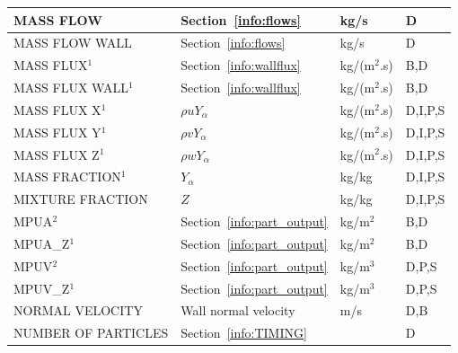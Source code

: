\documentclass[11pt]{book}
\begin{document}
\begin{longtable}{@{\extracolsep{\fill}}|l|l|l|l|}
{\ct MASS FLOW}                                 & Section~\ref{info:flows}                      & kg/s           & D            \\ \hline
{\ct MASS FLOW WALL}                            & Section~\ref{info:flows}                      & kg/s           & D            \\ \hline
{\ct MASS FLUX}$^1$                             & Section~\ref{info:wallflux}                   & \si{kg/(m$^2$.s)} & B,D       \\ \hline
{\ct MASS FLUX WALL}$^1$                        & Section~\ref{info:wallflux}                   & \si{kg/(m$^2$.s)} & B,D       \\ \hline
{\ct MASS FLUX X}$^1$                           & $\rho u Y_\alpha$                             & \si{kg/(m$^2$.s)} & D,I,P,S   \\ \hline
{\ct MASS FLUX Y}$^1$                           & $\rho v Y_\alpha$                             & \si{kg/(m$^2$.s)} & D,I,P,S   \\ \hline
{\ct MASS FLUX Z}$^1$                           & $\rho w Y_\alpha$                             & \si{kg/(m$^2$.s)} & D,I,P,S   \\ \hline
{\ct MASS FRACTION}$^1$                         & $Y_\alpha$                                    & kg/kg          & D,I,P,S      \\ \hline
{\ct MIXTURE FRACTION}                          & $Z$                                           & kg/kg          & D,I,P,S      \\ \hline
{\ct MPUA}$^2$                                  & Section~\ref{info:part_output}                & kg/m$^2$       & B,D          \\ \hline
{\ct MPUA\_Z}$^1$                               & Section~\ref{info:part_output}                & kg/m$^2$       & B,D          \\ \hline
{\ct MPUV}$^2$                                  & Section~\ref{info:part_output}                & kg/m$^3$       & D,P,S        \\ \hline
{\ct MPUV\_Z}$^1$                               & Section~\ref{info:part_output}                & kg/m$^3$       & D,P,S        \\ \hline
{\ct NORMAL VELOCITY}                           & Wall normal velocity                          & m/s            & D,B          \\ \hline
{\ct NUMBER OF PARTICLES}                       & Section~\ref{info:TIMING}                     &                & D            \\ \hline

\end{longtable}
\end{document}
